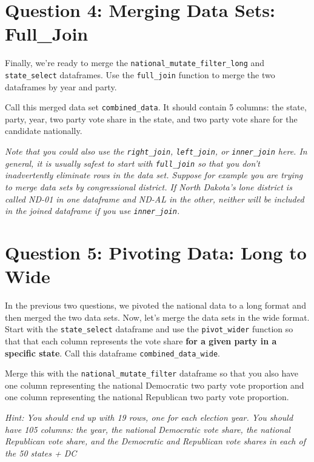 \documentclass[
]{article}
\begin{document}
\section{Question 4: Merging Data Sets:
Full\_Join}\label{question-4-merging-data-sets-full_join}

Finally, we're ready to merge the
\texttt{national\_mutate\_filter\_long} and \texttt{state\_select}
dataframes. Use the \texttt{full\_join} function to merge the two
dataframes by year and party.

Call this merged data set \texttt{combined\_data}. It should contain 5
columns: the state, party, year, two party vote share in the state, and
two party vote share for the candidate nationally.

\emph{Note that you could also use the \texttt{right\_join},
\texttt{left\_join}, or \texttt{inner\_join} here. In general, it is
usually safest to start with \texttt{full\_join} so that you don't
inadvertently eliminate rows in the data set. Suppose for example you
are trying to merge data sets by congressional district. If North
Dakota's lone district is called ND-01 in one dataframe and ND-AL in the
other, neither will be included in the joined dataframe if you use
\texttt{inner\_join}.}

\section{Question 5: Pivoting Data: Long to
Wide}\label{question-5-pivoting-data-long-to-wide}

In the previous two questions, we pivoted the national data to a long
format and then merged the two data sets. Now, let's merge the data sets
in the wide format. Start with the \texttt{state\_select} dataframe and
use the \texttt{pivot\_wider} function so that that each column
represents the vote share \textbf{for a given party in a specific
state}. Call this dataframe \texttt{combined\_data\_wide}.

Merge this with the \texttt{national\_mutate\_filter} dataframe so that
you also have one column representing the national Democratic two party
vote proportion and one column representing the national Republican two
party vote proportion.

\emph{Hint: You should end up with 19 rows, one for each election year.
You should have 105 columns: the year, the national Democratic vote
share, the national Republican vote share, and the Democratic and
Republican vote shares in each of the 50 states + DC}
\end{document}
